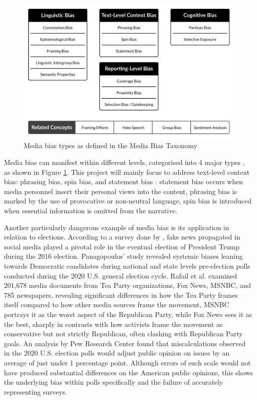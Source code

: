 \begin{figure}[htbp]
    \centering
    \includegraphics[width=0.9\linewidth]{images/bias-types-taxonomy.png}
    \caption{Media bias types as defined in the Media Bias Taxonomy \cite{spinde-2024-taxonomy}}
    \label{fig:bias-types-taxonomy}
\end{figure}

Media bias can manifest within different levels, categorised into 4 major types \cite{spinde-2024-taxonomy}, as shown in Figure \ref{fig:bias-types-taxonomy}. This project will mainly focus to address text-level context bias: phrasing bias, spin bias, and statement bias \cite{spinde-2024-taxonomy}: statement bias occurs when media personnel insert their personal views into the content, phrasing bias is marked by the use of provocative or non-neutral language, spin bias is introduced when essential information is omitted from the narrative.

Another particularly dangerous example of media bias is its application in relation to elections. According to a survey done by \cite{allcott-2017-socialmedia-2016election}, fake news propagated in social media played a pivotal role in the eventual election of President Trump during the 2016 election. Panagopoulos' study \cite{panagopoulos-2020} revealed systemic biases leaning towards Democratic candidates during national and state levels pre-election polls conducted during the 2020 U.S. general election cycle. Rafail et al. \cite{rafail-2018-tea-party} examined 201,678 media documents from Tea Party organizations, Fox News, MSNBC, and 785 newspapers, revealing significant differences in how the Tea Party frames itself compared to how other media sources frame the movement, MSNBC portrays it as the worst aspect of the Republican Party, while Fox News sees it as the best, sharply in contrasts with how activists frame the movement as conservative but not strictly Republican, often clashing with Republican Party goals. An analysis by Pew Research Center \cite{pew-2021-election2020} found that miscalculations observed in the 2020 U.S. election polls would adjust public opinion on issues by an average of just under 1 percentage point. Although errors of such scale would not have produced substantial differences on the American public opinions, this shows the underlying bias within polls specifically and the failure of accurately representing surveys.

